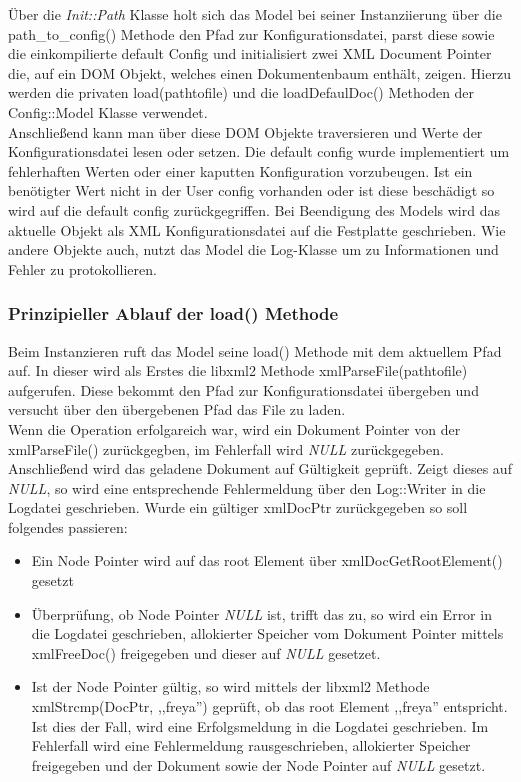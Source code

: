 Über die \emph{Init::Path} Klasse holt sich das Model bei seiner Instanziierung über die path\_to\_config() Methode
den Pfad zur Konfigurationsdatei, parst diese sowie die einkompilierte default Config und 
initialisiert zwei XML Document Pointer die, auf ein DOM Objekt, welches einen Dokumentenbaum enthält, zeigen.
Hierzu werden die privaten load(pathtofile) und die loadDefaulDoc() Methoden der Config::Model Klasse verwendet.
\\   

Anschließend kann man über diese DOM Objekte traversieren und Werte der Konfigurationsdatei lesen oder setzen.
Die default config wurde implementiert um fehlerhaften Werten oder einer kaputten Konfiguration vorzubeugen. Ist ein benötigter Wert
nicht in der User config vorhanden oder ist diese beschädigt so wird auf die default config zurückgegriffen.
Bei Beendigung des Models wird das aktuelle Objekt als XML Konfigurationsdatei auf die Festplatte geschrieben.
Wie andere Objekte auch, nutzt das Model die Log-Klasse um zu Informationen und Fehler zu protokollieren.



\subsubsection{Prinzipieller Ablauf der load() Methode}

Beim Instanzieren ruft das Model seine load() Methode mit dem aktuellem Pfad auf.
In dieser wird als Erstes die libxml2 Methode xmlParseFile(pathtofile) aufgerufen. Diese bekommt den
Pfad zur Konfigurationsdatei übergeben und versucht über den übergebenen Pfad das File zu laden.
\\
Wenn die Operation erfolgareich war, wird ein Dokument Pointer von der xmlParseFile() 
zurückgegben, im Fehlerfall wird \emph{NULL} zurückgegeben.
\\
Anschließend wird das geladene Dokument auf Gültigkeit geprüft. Zeigt dieses auf \emph{NULL}, so wird eine entsprechende Fehlermeldung über den Log::Writer in die Logdatei geschrieben. Wurde ein gültiger xmlDocPtr zurückgegeben so soll folgendes passieren:

\begin{itemize}
    \item Ein Node Pointer wird auf das root Element über xmlDocGetRootElement() gesetzt
    \item Überprüfung, ob Node Pointer \emph{NULL} ist, trifft das zu, so wird ein Error in die Logdatei geschrieben,
        allokierter Speicher vom Dokument Pointer mittels xmlFreeDoc() freigegeben und dieser auf \emph{NULL} gesetzet.
    \item Ist der Node Pointer gültig, so wird mittels der libxml2 Methode xmlStrcmp(DocPtr, ,,freya'') geprüft, ob das
        root Element ,,freya'' entspricht. Ist dies der Fall, wird eine Erfolgsmeldung in die Logdatei geschrieben. Im Fehlerfall wird eine Fehlermeldung rausgeschrieben, allokierter Speicher freigegeben
        und der Dokument sowie der Node Pointer auf \emph{NULL} gesetzt. 
\end{itemize}


